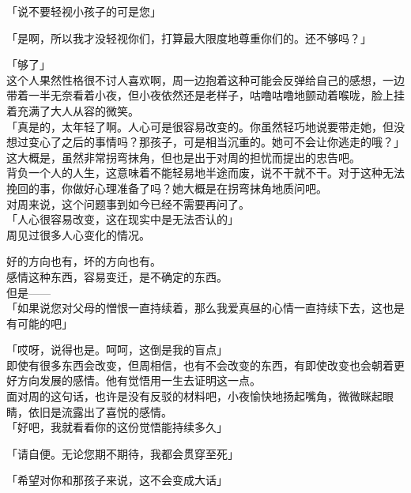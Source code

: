 「说不要轻视小孩子的可是您」

「是啊，所以我才没轻视你们，打算最大限度地尊重你们的。还不够吗？」

「够了」\\

这个人果然性格很不讨人喜欢啊，周一边抱着这种可能会反弹给自己的感想，一边带着一半无奈看着小夜，但小夜依然还是老样子，咕噜咕噜地颤动着喉咙，脸上挂着充满了大人从容的微笑。\\

「真是的，太年轻了啊。人心可是很容易改变的。你虽然轻巧地说要带走她，但没想过变心了之后的事情吗？那孩子，可是相当沉重的。她可不会让你逃走的哦？」\\

这大概是，虽然非常拐弯抹角，但也是出于对周的担忧而提出的忠告吧。\\

背负一个人的人生，这意味着不能轻易地半途而废，说不干就不干。对于这种无法挽回的事，你做好心理准备了吗？她大概是在拐弯抹角地质问吧。\\

对周来说，这个问题事到如今已经不需要再问了。\\

「人心很容易改变，这在现实中是无法否认的」\\

周见过很多人心变化的情况。

好的方向也有，坏的方向也有。\\

感情这种东西，容易变迁，是不确定的东西。\\

但是——\\

「如果说您对父母的憎恨一直持续着，那么我爱真昼的心情一直持续下去，这也是有可能的吧」

「哎呀，说得也是。呵呵，这倒是我的盲点」\\

即使有很多东西会改变，但周相信，也有不会改变的东西，有即使改变也会朝着更好方向发展的感情。他有觉悟用一生去证明这一点。\\

面对周的这句话，也许是没有反驳的材料吧，小夜愉快地扬起嘴角，微微眯起眼睛，依旧是流露出了喜悦的感情。\\

「好吧，我就看看你的这份觉悟能持续多久」

「请自便。无论您期不期待，我都会贯穿至死」

「希望对你和那孩子来说，这不会变成大话」\\

